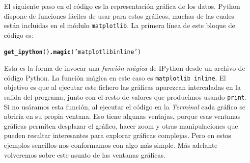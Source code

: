 \documentclass[10pt,a4paper]{article}\usepackage[]{graphicx}\usepackage[]{color}
\makeatletter
\newcommand{\hlstr}[1]{\textcolor[rgb]{0.192,0.494,0.8}{#1}}%
\newcommand{\hlkwd}[1]{\textcolor[rgb]{0.737,0.353,0.396}{\textbf{#1}}}%
\newenvironment{kframe}{%
 \def\at@end@of@kframe{}%
 \ifinner\ifhmode%
  \def\at@end@of@kframe{\end{minipage}}%
  \begin{minipage}{\columnwidth}%
 \fi\fi%
 \def\FrameCommand##1{\hskip\@totalleftmargin \hskip-\fboxsep
 \colorbox{shadecolor}{##1}\hskip-\fboxsep
     \hskip-\linewidth \hskip-\@totalleftmargin \hskip\columnwidth}%
 \MakeFramed {\advance\hsize-\width
   \@totalleftmargin\z@ \linewidth\hsize
   \@setminipage}}%
 {\par\unskip\endMakeFramed%
 \at@end@of@kframe}
\newenvironment{knitrout}{}{} %
\makeatother
\begin{document}
El siguiente paso en el código es la representación gráfica de los datos. Python dispone de funciones fáciles de usar para estos gráficos, muchas de las cuales están incluidas en el módulo {\tt matplotlib}. La primera línea de este bloque de código es:
\begin{knitrout}
\color{fgcolor}\begin{kframe}
\begin{alltt}
\hlkwd{get_ipython}()\hlkwd{.magic}(\hlstr{'matplotlib inline'})
\end{alltt}
\end{kframe}
\end{knitrout}
Esta es la forma de invocar una {\em función mágica} de IPython desde un archivo de código Python. La función mágica en este caso es {\tt matplotlib inline}. El objetivo es que al ejecutar este fichero las gráficas aparezcan intercaladas en la salida del programa, junto con el resto de valores que producimos usando {\tt print}. Si no usáramos esta función, al ejecutar el código en la {\em Terminal} cada gráfico se abriría en su propia ventana. Eso tiene algunas ventajas, porque esas ventanas gráficas permiten desplazar el gráfico, hacer zoom  y otras manipulaciones que pueden resultar interesantes para explorar gráficas complejas. Pero en estos ejemplos sencillos nos conformamos con algo más simple. Más adelante volveremos sobre este asunto de las ventanas gráficas.
\end{document}
